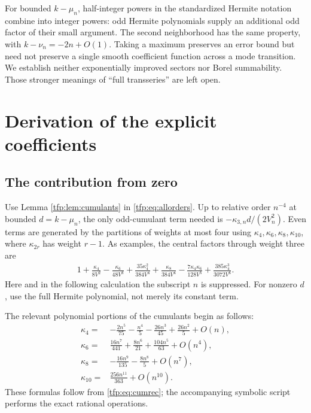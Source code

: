 \documentclass[11pt,a4paper]{article}
\numberwithin{equation}{section}
\theoremstyle{definition}\newtheorem{definition}[theorem]{Definition}
\theoremstyle{remark}\newtheorem{remark}[theorem]{Remark}
\begin{document}
For bounded $k-\mu_n$, half-integer powers in the standardized Hermite
notation combine into integer powers: odd Hermite polynomials supply
an additional odd factor of their small argument. The second
neighborhood has the same property, with $k-\nu_n=-2n+O(1)$.
Taking a maximum preserves an error bound but need not preserve a
single smooth coefficient function across a mode transition.
We establish neither exponentially improved sectors nor Borel
summability. Those stronger meanings of ``full transseries'' are left
open.

\section{Derivation of the explicit coefficients}\label{tfp:sec:coeff}
\subsection{The contribution from zero}
Use Lemma \ref{tfp:lem:cumulants} in \eqref{tfp:eq:allorders}. Up to relative
order $n^{-4}$ at bounded $d=k-\mu_n$, the only odd-cumulant term needed
is $-\kappa_{3,n}d/(2V_n^2)$. Even terms are generated by the partitions
of weights at most four using $\kappa_4,\kappa_6,\kappa_8,\kappa_{10}$,
where $\kappa_{2r}$ has weight $r-1$. As examples, the central factors
through weight three are
\begin{equation}\label{tfp:eq:centralfactors}
\begin{split}
 1+\frac{\kappa_4}{8V^2}
 -\frac{\kappa_6}{48V^3}
 +\frac{35\kappa_4^2}{384V^4}
 +\frac{\kappa_8}{384V^4}
 -\frac{7\kappa_4\kappa_6}{128V^5}
 +\frac{385\kappa_4^3}{3072V^6}.
\end{split}
\end{equation}
Here and in the following calculation the subscript $n$ is suppressed.
For nonzero $d$, use the full Hermite polynomial, not merely its
constant term.

The relevant polynomial portions of the cumulants begin as follows:
\begin{align}
 \kappa_4={}&-\frac{2n^5}{75}-\frac{n^4}{5}
        -\frac{26n^3}{45}+\frac{26n^2}{5}+O(n),\label{tfp:eq:k4poly}\\
 \kappa_6={}&\frac{16n^7}{441}+\frac{8n^6}{21}
        +\frac{104n^5}{63}+O(n^4),\label{tfp:eq:k6poly}\\
 \kappa_8={}&-\frac{16n^9}{135}-\frac{8n^8}{5}+O(n^7),\\
 \kappa_{10}={}&\frac{256n^{11}}{363}+O(n^{10}).
\end{align}
These formulas follow from \eqref{tfp:eq:cumrec}; the accompanying symbolic
script performs the exact rational operations.
\end{document}

